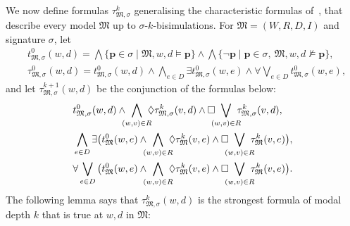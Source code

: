 \documentclass{lmcs} %
\theoremstyle{plain}\newtheorem{satz}[thm]{Satz} %
\newcommand{\fform}[1]{\boldsymbol{#1}}
\newcommand{\pvar}{\fform{p}}
\begin{document}
We now define formulas $\tau^k_{\mathfrak M,\sigma}$ generalising the characteristic formulas of~\cite{goranko20075}, that describe every model $\mathfrak{M}$ up to $\sigma$-$k$-bisimulations.
For $\mathfrak{M}=(W,R,D,I)$ and signature $\sigma$, let
%
\begin{align*}
	& t_{\mathfrak{M},\sigma}^{0}(w,d)= \bigwedge \{\pvar \in\sigma \mid \mathfrak{M},w,d\models \pvar\} \land{} 
	\bigwedge \{\neg \pvar \mid \pvar \in\sigma,\ \mathfrak{M},w,d\not\models \pvar\},\\
	& \tau_{\mathfrak{M},\sigma}^{0}(w,d)=t_{\mathfrak{M},\sigma}^{0}(w,d) \wedge{}
	\bigwedge_{e\in D} \exists t_{\mathfrak{M},\sigma}^{0}(w,e) \wedge \forall \bigvee_{e\in D} t_{\mathfrak{M},\sigma}^{0}(w,e) ,
\end{align*}
%
and let $\tau_{\mathfrak{M},\sigma}^{k+1}(w,d)$ be the conjunction of the formulas below: 
%
\begin{align*}
	& t_{\mathfrak{M},\sigma}^{0}(w,d) \wedge \hspace*{-2mm}  \bigwedge_{(w,v) \in R} \hspace*{-2mm} \Diamond \tau_{\mathfrak{M},\sigma}^{k}(v,d) \wedge \Box \hspace*{-2mm} \bigvee_{(w,v) \in R} \hspace*{-2mm}  \tau_{\mathfrak{M},\sigma}^{k}(v,d),\\
	& \bigwedge_{e\in D} \exists \big(t_{\mathfrak{M}}^{0}(w,e) \wedge \hspace*{-2mm} \bigwedge_{(w,v) \in R} \hspace*{-2mm} \Diamond \tau_{\mathfrak{M}}^{k}(v,e) \wedge 
	\Box \hspace*{-2mm} \bigvee_{(w,v) \in R} \hspace*{-2mm} \tau_{\mathfrak{M}}^{k}(v,e)\big),\\
	& \forall \bigvee_{e\in D} \big(t_{\mathfrak{M}}^{0}(w,e) \wedge \hspace*{-2mm} \bigwedge_{(w,v) \in R} \hspace*{-2mm} \Diamond \tau_{\mathfrak{M}}^{k}(v,e) \wedge 
	\Box \hspace*{-2mm} \bigvee_{(w,v) \in R} \hspace*{-2mm} \tau_{\mathfrak{M}}^{k}(v,e)\big).
\end{align*}
%
The following lemma says that $\tau^{k}_{\mathfrak{M},\sigma}(w,d)$
is the strongest formula of modal depth $k$ that is true at $w,d$ in $\mathfrak{M}$:
\end{document}
